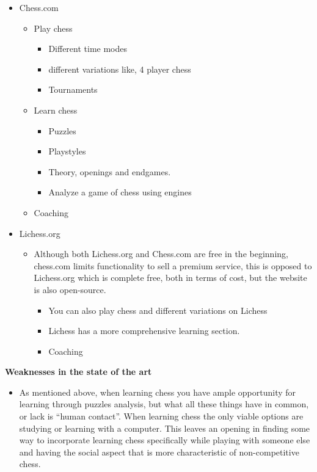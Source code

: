 \begin{itemize}
    \item Chess.com
    \begin{itemize}
        \item Play chess
        \begin{itemize}
            \item Different time modes
            \item different variations like, 4 player chess
            \item Tournaments
        \end{itemize}
        \item Learn chess
        \begin{itemize}
            \item Puzzles
            \item Playstyles
            \item Theory, openings and endgames.
            \item Analyze a game of chess using engines
        \end{itemize}
        \item Coaching
    \end{itemize}
    \item Lichess.org
    \begin{itemize}
        \item Although both Lichess.org and Chess.com are free in the beginning,
        chess.com limits functionality to sell a premium service,
        this is opposed to Lichess.org which is complete free,
        both in terms of cost, but the website is also open-source.
        \begin{itemize}
            \item You can also play chess and different variations on Lichess
            \item Lichess has a more comprehensive learning section.
            \item Coaching
        \end{itemize}
    \end{itemize}
\end{itemize}

\textbf{Weaknesses in the state of the art}

\begin{itemize}
    \item As mentioned above, when learning chess you have ample opportunity for learning through puzzles analysis,
    but what all these things have in common, or lack is “human contact”.
    When learning chess the only viable options are studying or learning with a computer.
    This leaves an opening in finding some way to incorporate learning chess specifically while playing with someone
    else and having the social aspect that is more characteristic of non-competitive chess.
\end{itemize}

